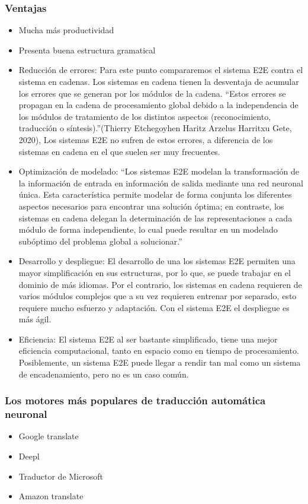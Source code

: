 \documentclass[conference]{IEEEtran}
\begin{document}
\subsubsection*{Ventajas}
\begin{itemize}
    \item Mucha más productividad
    \item Presenta buena estructura gramatical
    \item Reducción de errores: Para este punto compararemos el sistema E2E contra el sistema en cadenas. Los sistemas en cadena tienen la desventaja de acumular los errores que se generan por los módulos de la cadena. “Estos errores se propagan en la cadena de procesamiento global debido a la independencia de los módulos de tratamiento de los distintos aspectos (reconocimiento, traducción o síntesis).”(Thierry Etchegoyhen Haritz Arzelus Harritxu Gete, 2020), Los sistemas E2E no sufren de estos errores, a diferencia de los sistemas en cadena en el que suelen ser muy frecuentes.\cite{b4}
    \item Optimización de modelado: “Los sistemas E2E modelan la transformación de la información de entrada en información de salida mediante una red neuronal única. Esta característica permite modelar de forma conjunta los diferentes aspectos necesarios para encontrar una solución óptima; en contraste, los sistemas en cadena delegan la determinación de las representaciones a cada módulo de forma independiente, lo cual puede resultar en un modelado subóptimo del problema global a solucionar.”\cite{b4}
    \item Desarrollo y despliegue: El desarrollo de una los sistemas E2E permiten una mayor simplificación en sus estructuras, por lo que, se puede trabajar en el dominio de más idiomas. Por el contrario, los sistemas en cadena requieren de varios módulos complejos que a su vez requieren entrenar por separado, esto requiere mucho esfuerzo y adaptación. Con el sistema E2E el despliegue es más ágil.
    \item  Eficiencia: El sistema E2E al ser bastante simplificado, tiene una mejor eficiencia computacional, tanto en espacio como en tiempo de procesamiento. Posiblemente, un sistema E2E puede llegar a rendir tan mal como un sistema de encadenamiento, pero no es un caso común.
\end{itemize}

\subsubsection*{Los motores más populares de traducción automática neuronal}
\begin{itemize}
    \item Google translate
    \item Deepl
    \item Traductor de Microsoft
    \item Amazon translate
\end{itemize}
\end{document}
